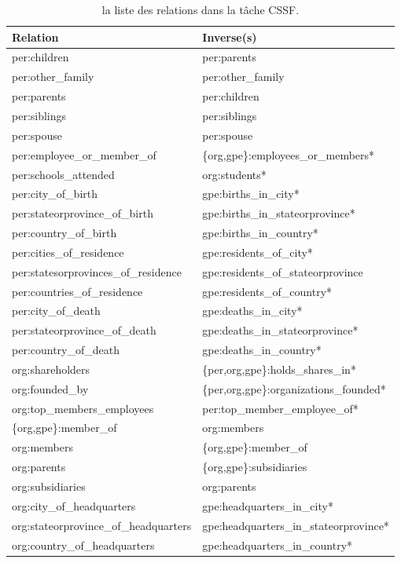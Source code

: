 \documentclass[12pt,a4paper,times,twoside,openright]{report}
\begin{document}
\begin{table}[ht!]
\centering
\begin{tabular}{|l|l|}
\hline
Relation & Inverse(s) \\
\hline
per:children & per:parents \\
per:other\_family & per:other\_family \\
per:parents & per:children \\
per:siblings & per:siblings \\
per:spouse & per:spouse \\
per:employee\_or\_member\_of & \{org,gpe\}:employees\_or\_members* \\
per:schools\_attended & org:students* \\
per:city\_of\_birth & gpe:births\_in\_city* \\
per:stateorprovince\_of\_birth & gpe:births\_in\_stateorprovince* \\
per:country\_of\_birth & gpe:births\_in\_country* \\
per:cities\_of\_residence & gpe:residents\_of\_city* \\
per:statesorprovinces\_of\_residence & gpe:residents\_of\_stateorprovince \\
per:countries\_of\_residence & gpe:residents\_of\_country* \\
per:city\_of\_death & gpe:deaths\_in\_city* \\
per:stateorprovince\_of\_death & gpe:deaths\_in\_stateorprovince* \\
per:country\_of\_death & gpe:deaths\_in\_country* \\
org:shareholders & \{per,org,gpe\}:holds\_shares\_in* \\
org:founded\_by & \{per,org,gpe\}:organizations\_founded* \\
org:top\_members\_employees & per:top\_member\_employee\_of* \\
\{org,gpe\}:member\_of & org:members \\
org:members & \{org,gpe\}:member\_of \\
org:parents & \{org,gpe\}:subsidiaries \\
org:subsidiaries & org:parents \\
org:city\_of\_headquarters & gpe:headquarters\_in\_city* \\
org:stateorprovince\_of\_headquarters & gpe:headquarters\_in\_stateorprovince* \\
org:country\_of\_headquarters & gpe:headquarters\_in\_country* \\
\hline
\end{tabular}
\caption{la liste des relations dans la tâche CSSF.}
\label{tab:CSSF-relations}
\end{table}
\end{document}
